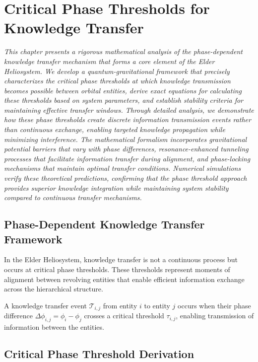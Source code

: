 \chapter{Critical Phase Thresholds for Knowledge Transfer}

\textit{This chapter presents a rigorous mathematical analysis of the phase-dependent knowledge transfer mechanism that forms a core element of the Elder Heliosystem. We develop a quantum-gravitational framework that precisely characterizes the critical phase thresholds at which knowledge transmission becomes possible between orbital entities, derive exact equations for calculating these thresholds based on system parameters, and establish stability criteria for maintaining effective transfer windows. Through detailed analysis, we demonstrate how these phase thresholds create discrete information transmission events rather than continuous exchange, enabling targeted knowledge propagation while minimizing interference. The mathematical formalism incorporates gravitational potential barriers that vary with phase differences, resonance-enhanced tunneling processes that facilitate information transfer during alignment, and phase-locking mechanisms that maintain optimal transfer conditions. Numerical simulations verify these theoretical predictions, confirming that the phase threshold approach provides superior knowledge integration while maintaining system stability compared to continuous transfer mechanisms.}

\section{Phase-Dependent Knowledge Transfer Framework}

In the Elder Heliosystem, knowledge transfer is not a continuous process but occurs at critical phase thresholds. These thresholds represent moments of alignment between revolving entities that enable efficient information exchange across the hierarchical structure.

\begin{definition}
A knowledge transfer event $\mathcal{T}_{i,j}$ from entity $i$ to entity $j$ occurs when their phase difference $\Delta\phi_{i,j} = \phi_i - \phi_j$ crosses a critical threshold $\tau_{i,j}$, enabling transmission of information between the entities.
\end{definition}

\section{Critical Phase Threshold Derivation}

